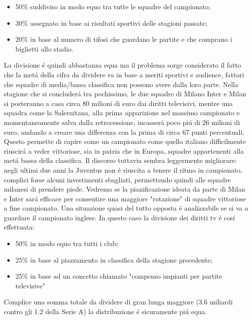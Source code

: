 \documentclass[
    corpo=12pt,
    oneside,
    evenboxes,
    tipotesi=triennale,
    stile=classica,
    oldstyle,
    autoretitolo,
    greek,
]{toptesi}
\begin{document}
\begin{interlinea}{1.5}
\begin{itemize}
    \item 50\% suddiviso in modo equo tra tutte le squadre del campionato;
    \item 30\% assegnato in base ai risultati sportivi delle stagioni passate;
    \item 20\% in base al numero di tifosi che guardano le partite e che comprano i biglietti allo stadio.
\end{itemize}
La divisione \'e quindi abbastanza equa ma il problema sorge considerato il fatto che la met\'a della cifra da dividere
va in base a meriti sportivi e audience, fattori che squadre di media/bassa classifica non possono avere dalla loro parte.
Nella stagione che si concluder\'a tra pochissimo, le due squadre di Milano Inter
e Milan si porteranno a casa circa 80 milioni di euro dai diritti televisivi, mentre una squadra come la Salernitana, alla prima apparizione 
nel massimo campionato e momentaneamente salva dalla retrocessione, incasser\'a poco pi\'u di 26 milioni di euro, andando a creare una differenza con la prima
di circa 67 punti percentuali. Questo permette di capire come un campionato come quello italiano difficilmente riuscir\'a a veder vittoriose,
sia in patria che in Europa, squadre appartenenti alla met\'a bassa della classifica. Il discorso tuttavia sembra leggermente migliorare:
negli ultimi due anni la Juventus non \'e riuscita a tenere il ritmo in campionato, complici forse alcuni investimenti sbagliati, permettendo 
quindi alle squadre milanesi di prendere piede. Vedremo se la pianificazione ideata da parte di Milan e Inter sar\'a efficace per consentire
una maggiore "rotazione" di squadre vittoriose a fine campionato.\newline
Una situazione quasi del tutto opposta \'e analizzabile se si va a guardare il \linebreak campionato inglese. In questo caso la divisione dei diritti tv \'e cos\'i effettuata:
\begin{itemize}
    \item 50\% in modo equo tra tutti i club;
    \item 25\% in base al piazzamento in classifica della stagione precedente;
    \item 25\% in base ad un concetto chiamato "compenso impianti per partite televisive"
\end{itemize}
Complice una somma totale da dividere di gran lunga maggiore (3.6 miliardi contro gli 1.2 della Serie A) la distribuzione \'e sicuramente pi\'u equa.

\end{interlinea}
\end{document}
